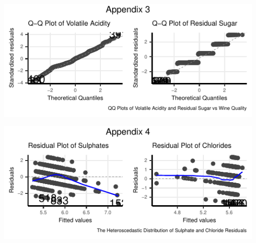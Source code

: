 \documentclass[letterpaper,8pt,twocolumn,twoside,]{pinp}
\begin{document}
\begin{center}\includegraphics{pinp_files/figure-latex/unnamed-chunk-4-3} \end{center}

\begin{center}\includegraphics{pinp_files/figure-latex/unnamed-chunk-4-4} \end{center}

\end{document}
